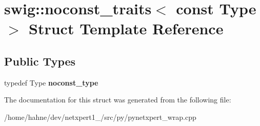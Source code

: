 \hypertarget{structswig_1_1noconst__traits_3_01const_01Type_01_4}{}\section{swig\+:\+:noconst\+\_\+traits$<$ const Type $>$ Struct Template Reference}
\label{structswig_1_1noconst__traits_3_01const_01Type_01_4}
\subsection*{Public Types}
\begin{DoxyCompactItemize}
\item 
typedef Type {\bfseries noconst\+\_\+type}\hypertarget{structswig_1_1noconst__traits_3_01const_01Type_01_4_a47a8b24d65b72185304a9e51211f721f}{}\label{structswig_1_1noconst__traits_3_01const_01Type_01_4_a47a8b24d65b72185304a9e51211f721f}

\end{DoxyCompactItemize}


The documentation for this struct was generated from the following file\+:\begin{DoxyCompactItemize}
\item 
/home/hahne/dev/netxpert1\+\_/src/py/pynetxpert\+\_\+wrap.\+cpp\end{DoxyCompactItemize}
